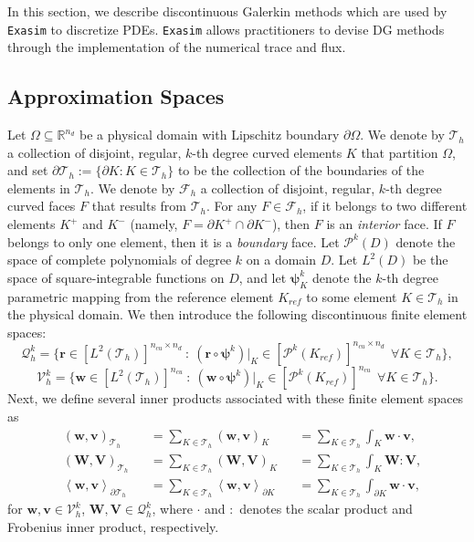\documentclass[11pt]{article}
\begin{document}
In this section, we describe discontinuous Galerkin methods which are used by \texttt{Exasim} to discretize PDEs. \texttt{Exasim} allows practitioners to devise DG methods through the implementation of the numerical  trace and flux.


\subsection{Approximation Spaces}

Let $\Omega \subseteq \mathbb{R}^{n_d}$ be a physical domain with Lipschitz boundary $\partial \Omega$. We denote by $\mathcal{T}_h$ a collection of disjoint, regular, $k$-th degree curved elements $K$ that partition $\Omega$, and set $\partial \mathcal{T}_h := \{ \partial K : K \in \mathcal{T}_h \} $ to be the collection of the boundaries of the elements in $\mathcal{T}_h$. We denote by $\mathcal{F}_h$ a collection of disjoint, regular, $k$-th degree curved faces $F$ that results from $\mathcal{T}_h$. For any $F \in \mathcal{F}_h$, if it belongs to two different elements  $K^+$ and $K^-$ (namely, $F = \partial K^+ \cap \partial K^-$), then $F$ is an {\em interior} face. If $F$ belongs to only one element, then it is a {\em boundary} face. Let $\mathcal{P}^{k}(D)$ denote the space of complete polynomials of degree $k$ on a domain $D$. Let $L^2(D)$ be the space of square-integrable functions on $D$, and let $\bm{\psi}^k_K$ denote the $k$-th degree parametric mapping from the reference element $K_{ref}$ to some element $K \in \mathcal{T}_h$ in the physical domain. We then introduce the following discontinuous finite element spaces:
$$\bm{\mathcal{Q}}_{h}^k  = \big\{\bm{r} \in [L^2(\mathcal{T}_h)]^{n_{cu} \times n_d} \ : \ (\bm{r} \circ \bm{\psi}^k )  |_K \in [\mathcal{P}^k(K_{ref})]^{n_{cu} \times n_d} \ \ \forall K \in \mathcal{T}_h \big\} , $$
$$\bm{\mathcal{V}}_{h}^k  = \big\{\bm{w} \in [L^2(\mathcal{T}_h)]^{n_{cu}} \ : \ (\bm{w} \circ \bm{\psi}^k )|_K \in [\mathcal{P}^k(K_{ref})]^{n_{cu}} \ \ \forall K \in \mathcal{T}_h \big\} . $$
Next, we define several inner products associated with these finite element spaces as
\begin{subequations}
\label{innerProducts}
\begin{alignat}{3}
& (\bm{w},\bm{v})_{\mathcal{T}_h} && = \sum_{K \in \mathcal{T}_h} (\bm{w}, \bm{v})_K && = \sum_{K \in \mathcal{T}_h} \int_{K} \bm{w} \cdot \bm{v} , \\
& (\bm{W},\bm{V})_{\mathcal{T}_h} && = \sum_{K \in \mathcal{T}_h} (\bm{W}, \bm{V})_K && = \sum_{K \in \mathcal{T}_h} \int_{K} \bm{W} : \bm{V} , \\
& \left\langle \bm{w}, \bm{v} \right\rangle_{\partial \mathcal{T}_h} && = \sum_{K \in \mathcal{T}_h} \left\langle \bm{w},\bm{v} \right\rangle_{\partial K} && = \sum_{K \in \mathcal{T}_h} \int_{\partial K} \bm{w} \cdot \bm{v} , 
\end{alignat}
\end{subequations}
for $\bm{w}, \bm{v} \in \bm{\mathcal{V}}_{h}^k$, $\bm{W}, \bm{V} \in \bm{\mathcal{Q}}_{h}^k$,  where $\cdot$ and $:$ denotes the scalar product and Frobenius inner product, respectively. 
\end{document}
